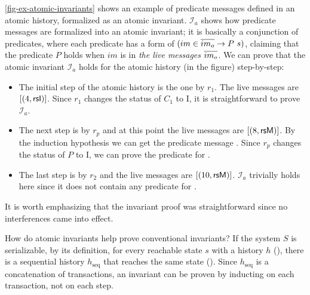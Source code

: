 \documentclass[sigplan,10pt,review,anonymous,screen]{acmart}\settopmatter{printfolios=true,printccs=false,printacmref=false}
\begin{document}
\autoref{fig-ex-atomic-invariants} shows an example of predicate messages defined in an atomic history, formalized as an atomic invariant.
$\mathcal{I}_a$ shows how predicate messages are formalized into an atomic invariant; it is basically a conjunction of predicates, where each predicate has a form of $(im \in \listof{im_o} \to P\ s)$, claiming that the predicate $P$ holds when $im$ is in \emph{the live messages} $\overline{im_o}$.
We can prove that the atomic invariant $\mathcal{I}_a$ holds for the atomic history (in the figure) step-by-step:
\begin{itemize}[leftmargin=*]
\item The initial step of the atomic history is the one by $r_1$. The live messages are $\lbrack (4, \textsf{rsI}) \rbrack$. Since $r_1$ changes the status of $C_1$ to I, it is straightforward to prove $\mathcal{I}_a$.
\item The next step is by $r_p$ and at this point the live messages are $\lbrack (8, \textsf{rsM}) \rbrack$. By the induction hypothesis we can get the predicate message . Since $r_p$ changes the status of $P$ to I, we can prove the predicate for .
\item The last step is by $r_2$ and the live messages are $\lbrack (10, \textsf{rsM}) \rbrack$. $\mathcal{I}_a$ trivially holds here since it does not contain any predicate for .
\end{itemize}
It is worth emphasizing that the invariant proof was straightforward since no interferences came into effect.

How do atomic invariants help prove conventional invariants?
If the system $S$ is serializable, by its definition, for every reachable state $s$ with a history $h$ (), there is a sequential history $h_\textrm{seq}$ that reaches the same state ().
Since $h_\textrm{seq}$ is a concatenation of transactions, an invariant can be proven by inducting on each transaction, not on each step.
\end{document}
